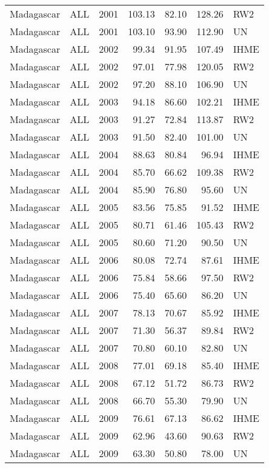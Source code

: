 \begin{longtable}{lllrrrl}
  Madagascar & ALL & 2001 & 103.13 & 82.10 & 128.26 & RW2 \\ 
  Madagascar & ALL & 2001 & 103.10 & 93.90 & 112.90 & UN \\ 
  Madagascar & ALL & 2002 & 99.34 & 91.95 & 107.49 & IHME \\ 
  Madagascar & ALL & 2002 & 97.01 & 77.98 & 120.05 & RW2 \\ 
  Madagascar & ALL & 2002 & 97.20 & 88.10 & 106.90 & UN \\ 
  Madagascar & ALL & 2003 & 94.18 & 86.60 & 102.21 & IHME \\ 
  Madagascar & ALL & 2003 & 91.27 & 72.84 & 113.87 & RW2 \\ 
  Madagascar & ALL & 2003 & 91.50 & 82.40 & 101.00 & UN \\ 
  Madagascar & ALL & 2004 & 88.63 & 80.84 & 96.94 & IHME \\ 
  Madagascar & ALL & 2004 & 85.70 & 66.62 & 109.38 & RW2 \\ 
  Madagascar & ALL & 2004 & 85.90 & 76.80 & 95.60 & UN \\ 
  Madagascar & ALL & 2005 & 83.56 & 75.85 & 91.52 & IHME \\ 
  Madagascar & ALL & 2005 & 80.71 & 61.46 & 105.43 & RW2 \\ 
  Madagascar & ALL & 2005 & 80.60 & 71.20 & 90.50 & UN \\ 
  Madagascar & ALL & 2006 & 80.08 & 72.74 & 87.61 & IHME \\ 
  Madagascar & ALL & 2006 & 75.84 & 58.66 & 97.50 & RW2 \\ 
  Madagascar & ALL & 2006 & 75.40 & 65.60 & 86.20 & UN \\ 
  Madagascar & ALL & 2007 & 78.13 & 70.67 & 85.92 & IHME \\ 
  Madagascar & ALL & 2007 & 71.30 & 56.37 & 89.84 & RW2 \\ 
  Madagascar & ALL & 2007 & 70.80 & 60.10 & 82.80 & UN \\ 
  Madagascar & ALL & 2008 & 77.01 & 69.18 & 85.40 & IHME \\ 
  Madagascar & ALL & 2008 & 67.12 & 51.72 & 86.73 & RW2 \\ 
  Madagascar & ALL & 2008 & 66.70 & 55.30 & 79.90 & UN \\ 
  Madagascar & ALL & 2009 & 76.61 & 67.13 & 86.62 & IHME \\ 
  Madagascar & ALL & 2009 & 62.96 & 43.60 & 90.63 & RW2 \\ 
  Madagascar & ALL & 2009 & 63.30 & 50.80 & 78.00 & UN \\ 

\end{longtable}
